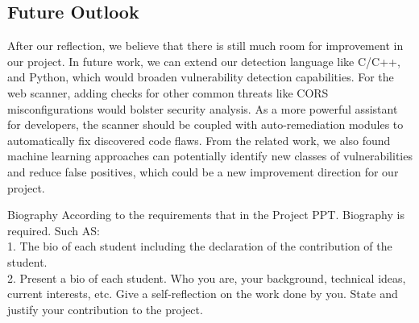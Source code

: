 \documentclass[journal]{IEEEtran}
\begin{document}
\subsection*{Future Outlook}
After our reflection, we believe that there is still much room for improvement in our project. In future work, we can extend our detection language like C/C++, and Python, which would broaden vulnerability detection capabilities. For the web scanner, adding checks for other common threats like CORS misconfigurations would bolster security analysis. As a more powerful assistant for developers, the scanner should be coupled with auto-remediation modules to automatically fix discovered code flaws. From the related work, we also found machine learning approaches can potentially identify new classes of vulnerabilities and reduce false positives, which could be a new improvement direction for our project.



 

\vspace{-5 mm}
\begin{IEEEbiography}{Biography} According to the requirements that in the Project PPT. Biography is required. Such AS:\\
1. The bio of each student including the declaration of the contribution of the student.\\
2. Present a bio of each student. Who you are, your background, technical ideas, current interests, etc. Give a \textcolor{BurntOrange}{self-reflection} on the work done by you. \textcolor{BurntOrange}{State and justify your contribution} to the project.


\end{IEEEbiography}


\end{document}
